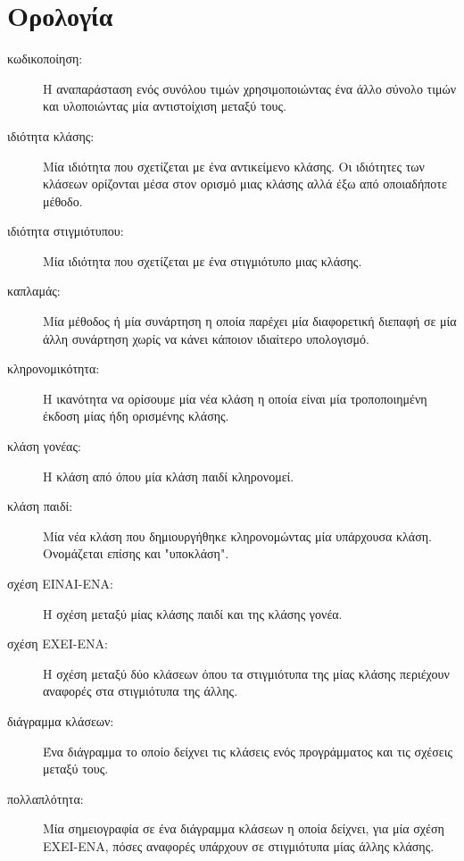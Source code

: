 \documentclass[10pt]{book}
\begin{document}
\section{Ορολογία}

\begin{description}

\item[κωδικοποίηση:]  Η αναπαράσταση ενός συνόλου τιμών χρησιμοποιώντας ένα άλλο 
σύνολο τιμών και υλοποιώντας μία αντιστοίχιση μεταξύ τους.

\item[ιδιότητα κλάσης:] Μία ιδιότητα που σχετίζεται με ένα αντικείμενο κλάσης.  Οι 
ιδιότητες των κλάσεων ορίζονται μέσα στον ορισμό μιας κλάσης αλλά έξω από οποιαδήποτε 
μέθοδο.

\item[ιδιότητα στιγμιότυπου:] Μία ιδιότητα που σχετίζεται με ένα στιγμιότυπο μιας κλάσης.

\item[καπλαμάς:] Μία μέθοδος ή μία συνάρτηση η οποία παρέχει μία διαφορετική 
διεπαφή σε μία άλλη συνάρτηση χωρίς να κάνει κάποιον ιδιαίτερο υπολογισμό.

\item[κληρονομικότητα:] Η ικανότητα να ορίσουμε μία νέα κλάση η οποία είναι 
μία τροποποιημένη έκδοση μίας ήδη ορισμένης κλάσης.

\item[κλάση γονέας:] Η κλάση από όπου μία κλάση παιδί κληρονομεί.

\item[κλάση παιδί:] Μία νέα κλάση που δημιουργήθηκε κληρονομώντας μία υπάρχουσα κλάση. 
Ονομάζεται επίσης και "υποκλάση". 

\item[σχέση ΕΙΝΑΙ-ΕΝΑ:] Η σχέση μεταξύ μίας κλάσης παιδί και της κλάσης γονέα.

\item[σχέση ΕΧΕΙ-ΕΝΑ:] Η σχέση μεταξύ δύο κλάσεων όπου τα στιγμιότυπα της μίας κλάσης 
περιέχουν αναφορές στα στιγμιότυπα της άλλης.

\item[διάγραμμα κλάσεων:] Ένα διάγραμμα το οποίο δείχνει τις κλάσεις ενός προγράμματος 
και τις σχέσεις μεταξύ τους.

\item[πολλαπλότητα:] Μία σημειογραφία σε ένα διάγραμμα κλάσεων η οποία δείχνει, για μία 
σχέση ΕΧΕΙ-ΕΝΑ, πόσες αναφορές υπάρχουν σε στιγμιότυπα μίας άλλης κλάσης.

\end{description}
\end{document}
